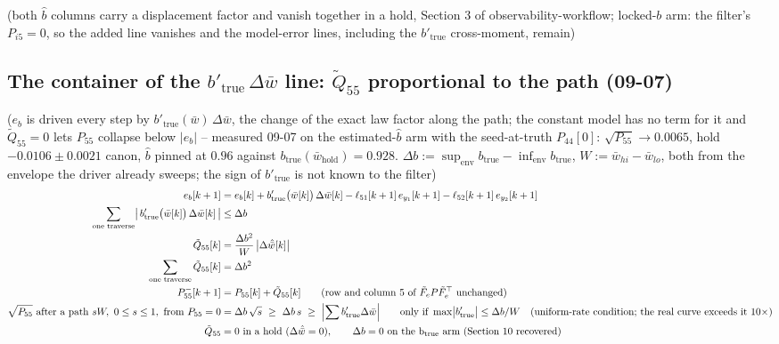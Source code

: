 \documentclass[11pt,a4paper,fontset=none]{ctexart}
\newcommand{\bw}{\bar{w}}
\newcommand{\dW}{\Delta\bw}
\newcommand{\dWh}{\Delta\hat{\bw}}
\begin{document}
(both $\hat{b}$ columns carry a displacement factor and vanish together in a hold, Section 3 of observability-workflow;
locked-$b$ arm: the filter's $P_{i5} = 0$, so the added line vanishes and the model-error lines, including the
$b'_{\mathrm{true}}$ cross-moment, remain)

\subsection*{The container of the $b'_{\mathrm{true}}\,\dW$ line: $\tilde{Q}_{55}$ proportional to the path (09-07)}

($e_b$ is driven every step by $b'_{\mathrm{true}}(\bw)\,\dW$, the change of the exact law factor along the path; the constant model
has no term for it and $\tilde{Q}_{55} = 0$ lets $P_{55}$ collapse below $|e_b|$ -- measured 09-07 on the estimated-$\hat b$ arm with
the seed-at-truth $P_{44}[0]$: $\sqrt{P_{55}} \to 0.0065$, hold $-0.0106 \pm 0.0021$ canon, $\hat b$ pinned at $0.96$ against
$b_{\mathrm{true}}(\bw_{\mathrm{hold}}) = 0.928$. $\Delta b := \sup_{\text{env}} b_{\mathrm{true}} - \inf_{\text{env}} b_{\mathrm{true}}$,
$W := \bw_{hi} - \bw_{lo}$, both from the envelope the driver already sweeps; the sign of $b'_{\mathrm{true}}$ is not known to the filter)
\begin{align*}
e_b[k+1] &= e_b[k] + b'_{\mathrm{true}}\bigl(\bw[k]\bigr)\,\dW[k] - \ell_{51}[k+1]\,e_{y_1}[k+1] - \ell_{52}[k+1]\,e_{y_2}[k+1] \\
\sum_{\text{one traverse}} \bigl|\,b'_{\mathrm{true}}\bigl(\bw[k]\bigr)\,\dW[k]\,\bigr| &\le \Delta b \\
\tilde{Q}_{55}[k] &= \frac{\Delta b^{2}}{W}\,\bigl|\dWh[k]\bigr| \\
\sum_{\text{one traverse}} \tilde{Q}_{55}[k] &= \Delta b^{2} \\
P_{55}^{-}[k+1] &= P_{55}[k] + \tilde{Q}_{55}[k] \qquad (\text{row and column 5 of } \tilde{F}_e P \tilde{F}_e^{\top} \text{ unchanged}) \\
\sqrt{P_{55}}\ \text{after a path } s W,\ 0 \le s \le 1,\ \text{from } P_{55} = 0 &= \Delta b\,\sqrt{s} \ \ge\ \Delta b\,s
  \ \ge\ \Bigl|\sum b'_{\mathrm{true}}\dW\Bigr| \qquad \text{only if } \max\bigl|b'_{\mathrm{true}}\bigr| \le \Delta b / W
  \quad (\text{uniform-rate condition; the real curve exceeds it } 10\times) \\
\tilde{Q}_{55} &= 0 \ \text{in a hold } (\dWh = 0) , \qquad \Delta b = 0 \ \text{on the b}_{\mathrm{true}}\text{ arm (Section 10 recovered)}
\end{align*}
\end{document}
